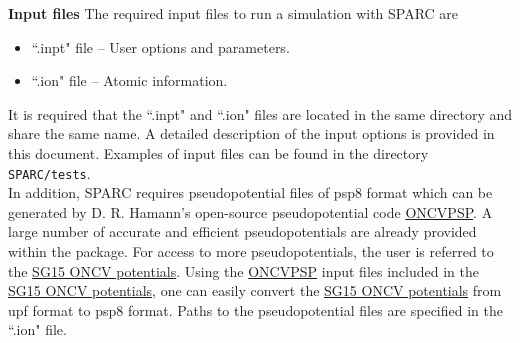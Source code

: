   
  \begin{frame}[allowframebreaks]{\textbf{Input files}} \label{Inputfiles}
  The required input files to run a simulation with SPARC are
  \begin{itemize}
    \item ``.inpt" file -- User options and parameters.
    \item ``.ion" file -- Atomic information.
  \end{itemize}
  It is required that the ``.inpt" and ``.ion" files are located in the same directory and share the same name. A detailed description of the input options is provided in this document. Examples of input files can be found in the directory \texttt{SPARC/tests}. \\
  \hspace{3mm}In addition, SPARC requires pseudopotential files of psp8 format which can be generated by D. R. Hamann's open-source pseudopotential code \href{http://www.mat-simresearch.com/}{ONCVPSP}. A large number of accurate and efficient pseudopotentials are already provided within the package. For access to more pseudopotentials, the user is referred to the \href{http://www.quantum-simulation.org/potentials/sg15_oncv/}{SG15 ONCV potentials}. Using the \href{http://www.mat-simresearch.com/}{ONCVPSP} input files included in the \href{http://www.quantum-simulation.org/potentials/sg15_oncv/}{SG15 ONCV potentials}, one can easily convert the \href{http://www.quantum-simulation.org/potentials/sg15_oncv/}{SG15 ONCV potentials} from upf format to psp8 format. Paths to the pseudopotential files are specified in the ``.ion" file.
  \end{frame}
  
  
  
